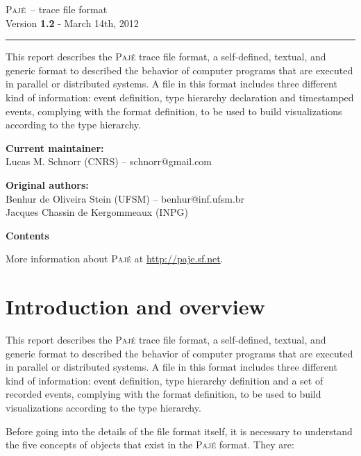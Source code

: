 \documentclass[12pt]{article}
\newcommand{\Paje}{\textsc{Paj\'e}\xspace}
\begin{document}
\begin{onehalfspace}
{\Huge \Paje~-- trace file format} \\
{\Large Version {\bf 1.2} - March 14th, 2012} \\
\rule{\linewidth}{2pt}
\end{onehalfspace}

This report describes the \Paje trace file format, a self-defined,
textual, and generic format to described the behavior of computer
programs that are executed in parallel or distributed systems. A file
in this format includes three different kind of information: event
definition, type hierarchy declaration and timestamped events,
complying with the format definition, to be used to build
visualizations according to the type hierarchy.

{\bf Current maintainer:} \\
Lucas M. Schnorr (CNRS) -- schnorr@gmail.com

{\bf Original authors:} \\
Benhur de Oliveira Stein (UFSM) -- benhur@inf.ufsm.br \\
Jacques Chassin de Kergommeaux (INPG)

\vfill
{\bf \Large{Contents}}
\tableofcontents
\vfill

More information about \Paje at \url{http://paje.sf.net}.

\thispagestyle{empty}
\newpage
\pagestyle{paje}

\section{Introduction and overview}
\label{s.Introduction}

This report describes the \Paje trace file format, a self-defined,
textual, and generic format to described the behavior of computer
programs that are executed in parallel or distributed systems. A file
in this format includes three different kind of information: event
definition, type hierarchy definition and a set of recorded events,
complying with the format definition, to be used to build
visualizations according to the type hierarchy.

Before going into the details of the file format itself, it is
necessary to understand the five concepts of objects that exist in the
\Paje format. They are:
\end{document}
